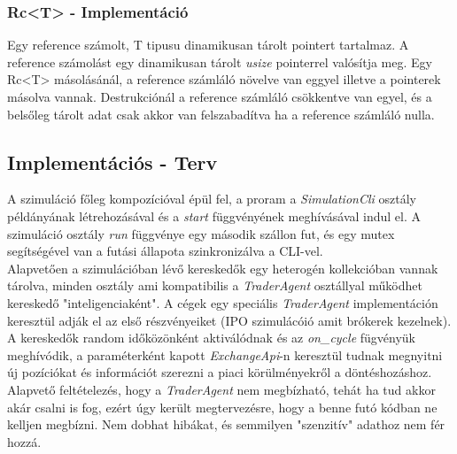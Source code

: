 \documentclass{article}[12pt,a4paper]
\begin{document}
    \subsubsection{Rc<T> - Implementáció}
    Egy reference számolt, T tipusu dinamikusan tárolt pointert tartalmaz.
    A reference számolást egy dinamikusan tárolt \textit{usize} pointerrel valósítja meg.
    Egy Rc<T> másolásánál, a reference számláló növelve van eggyel illetve a pointerek másolva vannak.
    Destrukciónál a reference számláló csökkentve van egyel, és a belsőleg tárolt adat csak akkor van felszabadítva ha a reference számláló nulla.

    \subsection{Implementációs - Terv}
    A szimuláció főleg kompozícióval épül fel, a proram a \textit{SimulationCli} osztály példányának létrehozásával és a \textit{start} függvényének meghívásával indul el.
    A szimuláció osztály \textit{run} függvénye egy második szállon fut, és egy mutex segítségével van a futási állapota szinkronizálva a CLI-vel. \\
    Alapvetően a szimulációban lévő kereskedők egy heterogén kollekcióban vannak tárolva, minden osztály ami kompatibilis a \textit{TraderAgent} osztállyal működhet kereskedő "inteligenciaként".
    A cégek egy speciális \textit{TraderAgent} implementáción keresztül adják el az első részvényeiket (IPO szimulácóió amit brókerek kezelnek). \\
    A kereskedők random időközönként aktiválódnak és az \textit{on\_cycle} fügvényük meghívódik, a paraméterként kapott \textit{ExchangeApi}-n keresztül tudnak megnyitni új pozíciókat és információt szerezni a piaci körülményekről a döntéshozáshoz.\\
    Alapvető feltételezés, hogy a \textit{TraderAgent} nem megbízható, tehát ha tud akkor akár csalni is fog, ezért úgy került megtervezésre, hogy a benne futó kódban ne kelljen megbízni.
    Nem dobhat hibákat, és semmilyen "szenzitív" adathoz nem fér hozzá.
\end{document}
